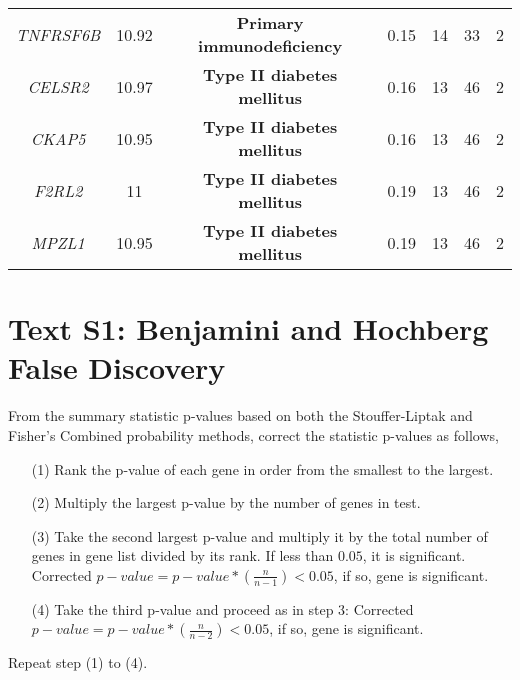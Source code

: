 \documentclass[10pt]{article}
\begin{document}
\begin{landscape}
\begin{table}[!htbp]
{\begin{tabular}{ccccccc}
\textit{TNFRSF6B}&10.92&\textbf{Primary immunodeficiency}&0.15&14&33&2 \\[2pt]
\textit{CELSR2}&10.97&\textbf{Type II diabetes mellitus}&0.16&13&46&2 \\[2pt]
\textit{CKAP5}&10.95&\textbf{Type II diabetes mellitus}&0.16&13&46&2 \\[2pt]
\textit{F2RL2}&11&\textbf{Type II diabetes mellitus}&0.19&13&46&2 \\[2pt]
\textit{MPZL1}&10.95&\textbf{Type II diabetes mellitus}&0.19&13&46&2 \\[1.5pt]\hline\hline
\end{tabular}}
\label{tab:dmGcancer}
\end{table}
\end{landscape}
	
\newpage

\section*{Text S1: Benjamini and Hochberg False Discovery}
From the summary statistic p-values based on both the Stouffer-Liptak \cite{lipt} and Fisher's Combined probability \cite{fish,hess} methods, correct the statistic p-values as follows,

\begin{itemize}
\item [(1)]Rank the p-value	 of each gene in order from the smallest to the largest.
\item [(2)]Multiply the largest p-value by the number of genes in test.
\item [(3)]Take the second largest p-value and multiply it by the total number of genes in gene list divided by its rank. If less than $0.05$, it is significant. Corrected $p-value = p-value*\left(\frac{n}{n-1}\right) < 0.05$, if so, gene is significant.
\item [(4)] Take the third p-value and proceed as in step 3: Corrected $p-value = p-value*\left(\frac{n}{n-2}\right) < 0.05$, if so, gene is significant. 
\end{itemize}
Repeat step (1) to (4).
\end{document}
